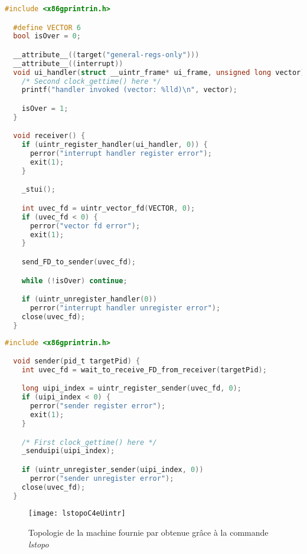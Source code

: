 \begin{lstlisting}[language=c, caption=Code récepteur, label={lst:receiverCode}]
  #include <x86gprintrin.h>

  #define VECTOR 6
  bool isOver = 0;

  __attribute__((target("general-regs-only")))
  __attribute__((interrupt))
  void ui_handler(struct __uintr_frame* ui_frame, unsigned long vector) {
    /* Second clock_gettime() here */
    printf("handler invoked (vector: %lld)\n", vector);

    isOver = 1;
  }

  void receiver() {
    if (uintr_register_handler(ui_handler, 0)) {
      perror("interrupt handler register error");
      exit(1);
    }

    _stui();

    int uvec_fd = uintr_vector_fd(VECTOR, 0);
    if (uvec_fd < 0) {
      perror("vector fd error");
      exit(1);
    }

    send_FD_to_sender(uvec_fd);

    while (!isOver) continue;

    if (uintr_unregister_handler(0))
      perror("interrupt handler unregister error");
    close(uvec_fd);
  }
\end{lstlisting}

\begin{lstlisting}[language=c, caption=Code émetteur, label={lst:senderCode}]
  #include <x86gprintrin.h>

  void sender(pid_t targetPid) {
    int uvec_fd = wait_to_receive_FD_from_receiver(targetPid);

    long uipi_index = uintr_register_sender(uvec_fd, 0);
    if (uipi_index < 0) {
      perror("sender register error");
      exit(1);
    }

    /* First clock_gettime() here */
    _senduipi(uipi_index);

    if (uintr_unregister_sender(uipi_index, 0))
      perror("sender unregister error");
    close(uvec_fd);
  }
\end{lstlisting}

\begin{figure}[H]
  \texttt{[image: lstopoC4eUintr]}
  \caption{Topologie de la machine fournie par \atos{} obtenue grâce à la commande \emph{lstopo}}
  \label{fig:lstopo}
\end{figure}

